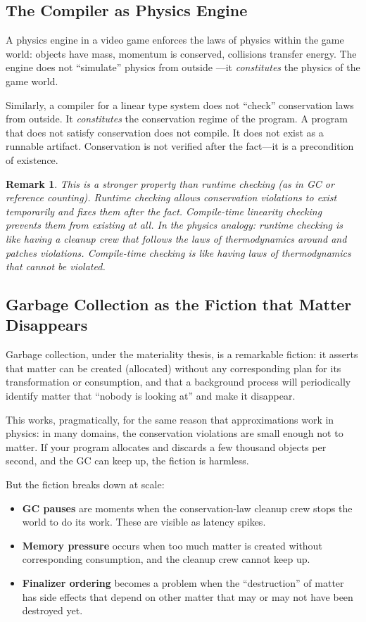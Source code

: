 \documentclass[11pt,a4paper]{article}
\newtheorem{remark}[theorem]{Remark}
\begin{document}
\subsection{The Compiler as Physics Engine}

A physics engine in a video game enforces the laws of physics within
the game world: objects have mass, momentum is conserved, collisions
transfer energy. The engine does not ``simulate'' physics from outside
---it \emph{constitutes} the physics of the game world.

Similarly, a compiler for a linear type system does not ``check''
conservation laws from outside. It \emph{constitutes} the
conservation regime of the program. A program that does not satisfy
conservation does not compile. It does not exist as a runnable
artifact. Conservation is not verified after the fact---it is a
precondition of existence.

\begin{remark}
This is a stronger property than runtime checking (as in GC or
reference counting). Runtime checking allows conservation violations
to exist temporarily and fixes them after the fact. Compile-time
linearity checking prevents them from existing at all. In the
physics analogy: runtime checking is like having a cleanup crew that
follows the laws of thermodynamics around and patches violations.
Compile-time checking is like having laws of thermodynamics that
cannot be violated.
\end{remark}

\subsection{Garbage Collection as the Fiction that Matter Disappears}

Garbage collection, under the materiality thesis, is a remarkable
fiction: it asserts that matter can be created (allocated) without any
corresponding plan for its transformation or consumption, and that a
background process will periodically identify matter that ``nobody is
looking at'' and make it disappear.

This works, pragmatically, for the same reason that approximations
work in physics: in many domains, the conservation violations are
small enough not to matter. If your program allocates and discards
a few thousand objects per second, and the GC can keep up, the
fiction is harmless.

But the fiction breaks down at scale:
\begin{itemize}
\item \textbf{GC pauses} are moments when the conservation-law
  cleanup crew stops the world to do its work. These are visible
  as latency spikes.
\item \textbf{Memory pressure} occurs when too much matter is
  created without corresponding consumption, and the cleanup crew
  cannot keep up.
\item \textbf{Finalizer ordering} becomes a problem when the
  ``destruction'' of matter has side effects that depend on
  other matter that may or may not have been destroyed yet.
\end{itemize}
\end{document}
